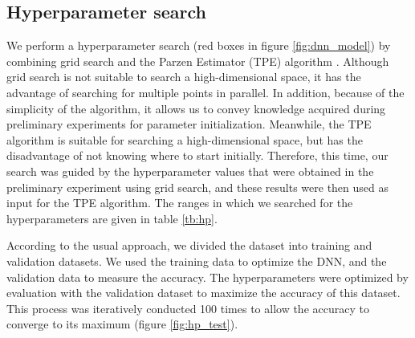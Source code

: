 \documentclass[proof]{pasj01}
\providecommand{\DIFadd}[1]{{\protect\color{blue} \sf #1}} %
\providecommand{\DIFdel}[1]{{\protect\color{red} \scriptsize #1}} %
\providecommand{\DIFaddbegin}{\protect\color{blue}} %
\providecommand{\DIFaddend}{\protect\color{black}} %
\providecommand{\DIFdelbegin}{\protect\color{red}} %
\providecommand{\DIFdelend}{\protect\color{black}} %
\newcommand{\DIFscaledelfig}{0.5}
\newlength{\DIFdelgraphicswidth} %
\newlength{\DIFdelgraphicsheight} %
\newcommand{\DIFaddincludegraphics}[2][]{{\color{blue}\fbox{\DIFOincludegraphics[#1]{#2}}}} %
\newcommand{\DIFdelincludegraphics}[2][]{%
\sbox{\DIFdelgraphicsbox}{\DIFOincludegraphics[#1]{#2}}%
\settoboxwidth{\DIFdelgraphicswidth}{\DIFdelgraphicsbox} %
\settoboxtotalheight{\DIFdelgraphicsheight}{\DIFdelgraphicsbox} %
\scalebox{\DIFscaledelfig}{%
\parbox[b]{\DIFdelgraphicswidth}{\usebox{\DIFdelgraphicsbox}\\[-\baselineskip] \rule{\DIFdelgraphicswidth}{0em}}\llap{\resizebox{\DIFdelgraphicswidth}{\DIFdelgraphicsheight}{%
\setlength{\unitlength}{\DIFdelgraphicswidth}%
\begin{picture}(1,1)%
\thicklines\linethickness{2pt} %
{\color[rgb]{1,0,0}\put(0,0){\framebox(1,1){}}}%
{\color[rgb]{1,0,0}\put(0,0){\line( 1,1){1}}}%
{\color[rgb]{1,0,0}\put(0,1){\line(1,-1){1}}}%
\end{picture}%
}\hspace*{3pt}}} %
} %
\DeclareRobustCommand{\DIFaddbegin}{\DIFOaddbegin \let\includegraphics\DIFaddincludegraphics} %
\DeclareRobustCommand{\DIFaddend}{\DIFOaddend \let\includegraphics\DIFOincludegraphics} %
\DeclareRobustCommand{\DIFdelbegin}{\DIFOdelbegin \let\includegraphics\DIFdelincludegraphics} %
\DeclareRobustCommand{\DIFdelend}{\DIFOaddend \let\includegraphics\DIFOincludegraphics} %
\begin{document}
\subsection{Hyperparameter search}\label{hyperparametersearch}
We perform a hyperparameter search (red boxes in figure \ref{fig:dnn_model}) by combining grid search and the \DIFdelbegin \DIFdel{Tree-structured }\DIFdelend \DIFaddbegin \DIFadd{tree-structured }\DIFaddend Parzen Estimator (TPE) algorithm \citep{pmlr-v28-bergstra13}.
Although grid search is not suitable to search a high-dimensional space, it has the advantage of searching for multiple points in parallel.
In addition, because of the simplicity of the algorithm, it allows us to convey knowledge acquired during preliminary experiments for parameter initialization.
Meanwhile, the TPE algorithm is suitable for searching a high-dimensional space, but has the disadvantage of not knowing where to start initially.
Therefore, this time, our search was guided by the hyperparameter values that were obtained in the preliminary experiment using grid search, and these results were then used as input for the TPE algorithm.  
The ranges in which we searched for the hyperparameters are given in table \ref{tb:hp}.

According to the usual approach, we divided the dataset into training and validation datasets.
We used the training data to optimize the DNN, and the validation data to measure the accuracy.
The hyperparameters were optimized by evaluation with the validation dataset to maximize the accuracy of this dataset.
This process was iteratively conducted 100 times to allow the accuracy to converge to its maximum (figure \ref{fig:hp_test}).

%
\begin{table}[htbp]
  \label{tb:hp}
\end{table}
\end{document}
